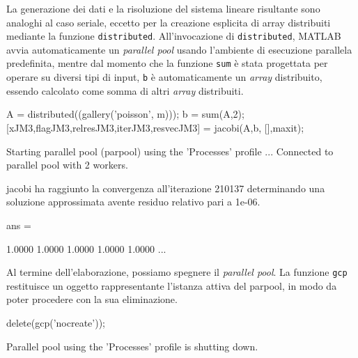La generazione dei dati e la risoluzione del sistema lineare risultante sono analoghi al caso seriale, eccetto per la creazione esplicita di array
distribuiti mediante la funzione \lstinline{distributed}.\newline
All'invocazione di \lstinline{distributed}, MATLAB avvia automaticamente un \textit{parallel pool} usando l'ambiente di esecuzione parallela predefinita, mentre dal momento che la funzione \lstinline{sum} \`e stata progettata per operare su diversi tipi di input, \lstinline{b} \`e automaticamente un \textit{array} distribuito, essendo
calcolato come somma di altri \textit{array} distribuiti.
\begin{matlabcode}
    A = distributed((gallery('poisson', m)));
    b = sum(A,2);
    [xJM3,flagJM3,relresJM3,iterJM3,resvecJM3] = jacobi(A,b,
                                                 [],maxit);
\end{matlabcode}
\begin{matlaboutput}
    Starting parallel pool (parpool) using the 'Processes' 
    profile ...
    Connected to parallel pool with 2 workers.

    jacobi ha raggiunto la convergenza all'iterazione 210137
    determinando una soluzione approssimata avente residuo
    relativo pari a 1e-06.
\end{matlaboutput}
\begin{matlaboutput}
    ans =

    1.0000    1.0000    1.0000    1.0000    1.0000    ...
\end{matlaboutput}
Al termine dell'elaborazione, possiamo spegnere il \textit{parallel pool}. La funzione \lstinline{gcp} restituisce un oggetto rappresentante l'istanza attiva del parpool, in modo da poter procedere con la sua eliminazione.
\begin{matlabcode}
    delete(gcp('nocreate'));
\end{matlabcode}
\begin{matlaboutput}
    Parallel pool using the 'Processes' profile is shutting down.
\end{matlaboutput}
